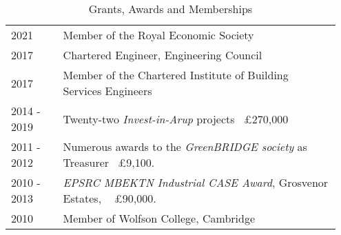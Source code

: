 \documentclass[11pt, oneside]{article}   	%
\begin{document}
\begin{table}[h]
\caption*{Grants, Awards and Memberships}
\vspace{-5mm}
\small
\begin{center}
\begin{tabular}{p{0.15\linewidth} p{0.8\linewidth}}
\hline
2021&Member of the Royal Economic Society\\
2017&Chartered Engineer, Engineering Council \\
2017 &Member of the Chartered Institute of Building Services Engineers\\
2014 - 2019&Twenty-two \emph{Invest-in-Arup} projects ~£270,000 \\
2011 - 2012&Numerous awards to the \emph{GreenBRIDGE society} as Treasurer ~£9,100. \\
2010 - 2013&\emph{EPSRC MBEKTN Industrial CASE Award}, Grosvenor Estates, ~ £90,000. \\
2010&Member of Wolfson College, Cambridge\\
\hline
\end{tabular}
\end{center}
\vspace{-10mm}
\end{table}

\pagebreak
\end{document}
